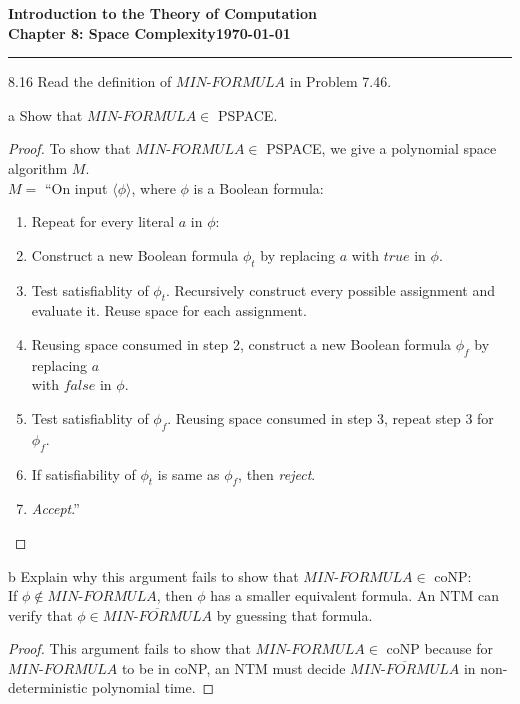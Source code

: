 \documentclass[11pt]{article}
\newcommand{\dated}{\today}
\begin{document}
\textbf{Introduction to the Theory of
Computation}\hfill\textbf{\myname}\\[0.01in]
\textbf{Chapter 8: Space Complexity}\hfill\textbf{\dated}\\
\smallskip\hrule\bigskip

\begin{problem}{8.16}
Read the definition of $MIN\text{-}FORMULA$ in Problem 7.46.
\end{problem}

\begin{problem}[Part]{a}
Show that $MIN\text{-}FORMULA \in$ PSPACE.
\end{problem}

\begin{proof}
To show that $MIN\text{-}FORMULA \in$ PSPACE, we give a polynomial space algorithm $M$. \\

$M =$ \textquotedblleft On input $\langle \phi \rangle$, where $\phi$ is a Boolean formula:
\begin{enumerate}
\item Repeat for every literal $a$ in $\phi$:
\item \hspace*{0.5cm} Construct a new Boolean formula $\phi_t$ by replacing $a$ with $true$ in $\phi$.
\item \hspace*{0.5cm} Test satisfiablity of $\phi_t$. Recursively construct every possible assignment and evaluate it.
\hspace*{0.5cm} Reuse space for each assignment.
\item \hspace*{0.5cm} Reusing space consumed in step 2, construct a new Boolean formula $\phi_f$ by replacing $a$ \\
\hspace*{0.5cm} with $false$ in $\phi$.
\item \hspace*{0.5cm} Test satisfiablity of $\phi_f$. Reusing space consumed in step 3, repeat step 3 for $\phi_f$.
\item \hspace*{0.5cm} If satisfiability of $\phi_t$ is same as $\phi_f$, then \textit{reject}.
\item \textit{Accept}.\textquotedblright
\end{enumerate}
\end{proof}

\begin{problem}[Part]{b}
Explain why this argument fails to show that $MIN\text{-}FORMULA \in$ coNP: \\
If $\phi \notin MIN\text{-}FORMULA$, then $\phi$ has a smaller equivalent formula. An NTM can verify that $\phi \in \overline{MIN\text{-}FORMULA}$ by guessing that formula.
\end{problem}

\begin{proof}
This argument fails to show that $MIN\text{-}FORMULA \in$ coNP because for $MIN\text{-}FORMULA$ to be in coNP, an NTM must decide $\overline{MIN\text{-}FORMULA}$ in non-deterministic polynomial time.
\end{proof}
\end{document}
